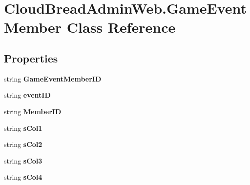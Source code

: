 \hypertarget{a00081}{}\section{Cloud\+Bread\+Admin\+Web.\+Game\+Event\+Member Class Reference}
\label{a00081}
\subsection*{Properties}
\begin{DoxyCompactItemize}
\item 
string {\bfseries Game\+Event\+Member\+ID}\hypertarget{a00081_a651d1629ec9958bbd1c33f4c4e6c97d4}{}\label{a00081_a651d1629ec9958bbd1c33f4c4e6c97d4}

\item 
string {\bfseries event\+ID}\hypertarget{a00081_a574e5d67df647eba163c9a1bc319c77f}{}\label{a00081_a574e5d67df647eba163c9a1bc319c77f}

\item 
string {\bfseries Member\+ID}\hypertarget{a00081_a085b6a4f56c6ed2ec95fd1c35bf34d67}{}\label{a00081_a085b6a4f56c6ed2ec95fd1c35bf34d67}

\item 
string {\bfseries s\+Col1}\hypertarget{a00081_aaeb96916c15c51b0ad086f9f38550bc6}{}\label{a00081_aaeb96916c15c51b0ad086f9f38550bc6}

\item 
string {\bfseries s\+Col2}\hypertarget{a00081_ac755b234cb5cba0faab04ed6ffe236f8}{}\label{a00081_ac755b234cb5cba0faab04ed6ffe236f8}

\item 
string {\bfseries s\+Col3}\hypertarget{a00081_a946e643c56952399557c41b4b397f2c7}{}\label{a00081_a946e643c56952399557c41b4b397f2c7}

\item 
string {\bfseries s\+Col4}\hypertarget{a00081_a04b6a857a76309dbf8a5e682e4d85f17}{}\label{a00081_a04b6a857a76309dbf8a5e682e4d85f17}


\end{DoxyCompactItemize}
